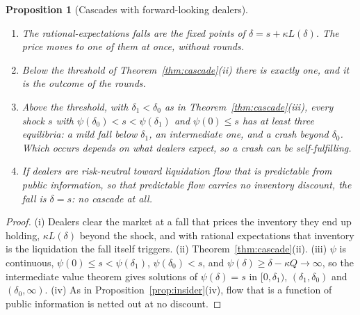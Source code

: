 \documentclass[12pt]{article}
\newtheorem{proposition}[theorem]{Proposition}
\theoremstyle{definition}
\theoremstyle{remark}
\begin{document}
\begin{proposition}[Cascades with forward-looking dealers]\label{prop:reecascade}
\begin{enumerate}[label=(\roman*),itemsep=1pt]
\item The rational-expectations falls are the fixed points of $\delta=s+\kappa L(\delta)$. The price moves to one of them at once, without rounds.
\item Below the threshold of Theorem~\ref{thm:cascade}(ii) there is exactly one, and it is the outcome of the rounds.
\item Above the threshold, with $\delta_1<\delta_0$ as in Theorem~\ref{thm:cascade}(iii), every shock $s$ with $\psi(\delta_0)<s<\psi(\delta_1)$ and $\psi(0)\le s$ has at least three equilibria: a mild fall below $\delta_1$, an intermediate one, and a crash beyond $\delta_0$. Which occurs depends on what dealers expect, so a crash can be self-fulfilling.
\item If dealers are risk-neutral toward liquidation flow that is predictable from public information, so that predictable flow carries no inventory discount, the fall is $\delta=s$: no cascade at all.
\end{enumerate}
\end{proposition}

\begin{proof}
(i) Dealers clear the market at a fall that prices the inventory they end up holding, $\kappa L(\delta)$ beyond the shock, and with rational expectations that inventory is the liquidation the fall itself triggers. (ii) Theorem~\ref{thm:cascade}(ii). (iii) $\psi$ is continuous, $\psi(0)\le s<\psi(\delta_1)$, $\psi(\delta_0)<s$, and $\psi(\delta)\ge\delta-\kappa Q\to\infty$, so the intermediate value theorem gives solutions of $\psi(\delta)=s$ in $[0,\delta_1)$, $(\delta_1,\delta_0)$ and $(\delta_0,\infty)$. (iv) As in Proposition~\ref{prop:insider}(iv), flow that is a function of public information is netted out at no discount.
\end{proof}
\end{document}
